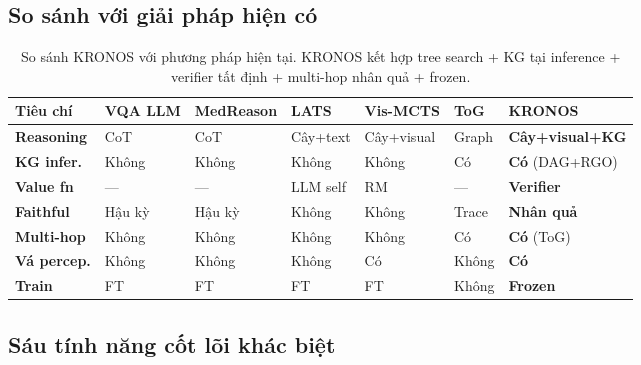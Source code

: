 \documentclass[11pt,a4paper]{article}
\begin{document}
\subsection{So sánh với giải pháp hiện có}

\begin{table}[H]
\centering\small
\renewcommand{\arraystretch}{1.3}
\begin{tabular}{>{\bfseries}p{2cm} p{1.7cm} p{1.7cm} p{1.7cm} p{1.7cm} p{1.7cm} p{2.2cm}}
\toprule
Tiêu chí & VQA LLM & MedReason & LATS & Vis-MCTS & ToG & \textbf{KRONOS} \\
\midrule
Reasoning & CoT & CoT & Cây+text & Cây+visual & Graph & \textbf{Cây+visual+KG} \\
KG infer. & Không & Không & Không & Không & Có & \textbf{Có} (DAG+RGO) \\
Value fn & --- & --- & LLM self & RM & --- & \textbf{Verifier} \\
Faithful & Hậu kỳ & Hậu kỳ & Không & Không & Trace & \textbf{Nhân quả} \\
Multi-hop & Không & Không & Không & Không & Có & \textbf{Có} (ToG) \\
Vá percep. & Không & Không & Không & Có & Không & \textbf{Có} \\
Train & FT & FT & FT & FT & Không & \textbf{Frozen} \\
\bottomrule
\end{tabular}
\caption{So sánh KRONOS với phương pháp hiện tại. KRONOS kết hợp tree search + KG tại inference + verifier tất định + multi-hop nhân quả + frozen.}
\end{table}

\subsection{Sáu tính năng cốt lõi khác biệt}
\end{document}
